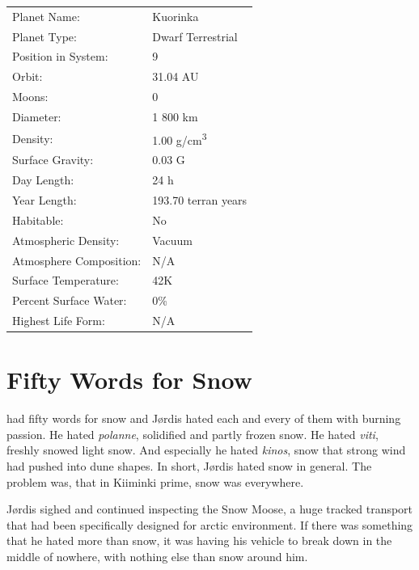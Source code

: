 \documentclass{tufte-book}
\begin{document}
\bigskip
\begin{minipage}{\textwidth}
\begin{center}
\begin{tabular}{ll}
\toprule
Planet Name: & Kuorinka \\
Planet Type: & Dwarf Terrestrial \\
Position in System: & 9 \\
Orbit: & 31.04 AU \\
Moons: & 0 \\
Diameter: & 1 800 km \\
Density: & 1.00 g/cm\textsuperscript{3} \\
Surface Gravity: & 0.03 G \\
Day Length: & 24 h \\
Year Length: & 193.70 terran years \\
Habitable: & No \\
\quad Atmospheric Density: & Vacuum \\
\quad Atmosphere Composition: & N/A \\
\quad Surface Temperature: & 42K \\
\quad Percent Surface Water: & 0\% \\
\quad Highest Life Form: & N/A \\

\bottomrule
\end{tabular}
\end{center}
\end{minipage}



\chapter{Fifty Words for Snow}

 had fifty words for snow and
J\o rdis hated each and every of them with burning passion. He hated
\emph{polanne}, solidified and partly frozen snow. He hated \emph{viti}, 
freshly snowed light snow. And especially he hated \emph{kinos}, snow 
that strong wind had pushed into dune shapes. In short, J\o rdis hated 
snow in general. The problem was, that in Kiiminki prime, snow was 
everywhere.

J\o rdis sighed and continued inspecting the Snow Moose, a huge
tracked transport that had been specifically designed for arctic
environment. If there was something that he hated more than snow, it
was having his vehicle to break down in the middle of nowhere, with
nothing else than snow around him.
\end{document}
